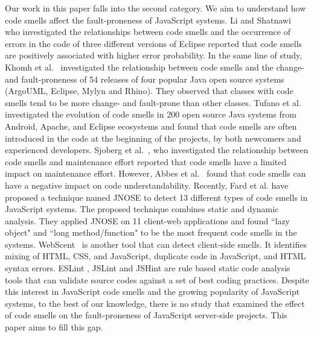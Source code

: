 \begin{sloppypar}
Our work in this paper falls into the second category. We aim to understand how code smells affect the fault-proneness of JavaScript systems. Li and Shatnawi~\cite{shatnawi2006investigation} who investigated the relationships between code smells and the occurrence of errors in the code of three different versions of Eclipse reported that code smells are positively associated with higher error probability. In the same line of study, Khomh et al.~\cite{khomh2012exploratory} investigated the relationship between code smells and the change- and fault-proneness of 54 releases of four popular Java open source systems (ArgoUML, Eclipse, Mylyn and Rhino). They observed that classes with code smells tend to be more change- and fault-prone than other classes. Tufano et al. \cite{tufano2015and} investigated the evolution of code smells in 200 open source Java systems from Android, Apache, and Eclipse ecosystems and found that code smells are often introduced in the code at the beginning of the projects, by both newcomers and experienced developers. Sjoberg et al.~\cite{Sjoberg13QEC}, who investigated the relationship between code smells and maintenance effort reported that code smells have a limited impact on maintenance effort. However, Abbes et al.~\cite{Abbes11} found that code smells can have a negative impact on code understandability. Recently, Fard et al. \cite{fard2013jsnose} have proposed a technique named JNOSE to detect 13 different types of code smells in JavaScript systems. The proposed technique combines static and dynamic analysis. They applied JNOSE on 11 client-web applications and found ``lazy object" and ``long method/function" to be the most frequent code smells in the systems. WebScent~\cite{nguyen2012detection} is another tool that can detect client-side smells. It identifies mixing of HTML, CSS, and JavaScript, duplicate code in JavaScript, and HTML syntax errors. ESLint \cite{ESLint}, JSLint \cite{JslinT} and JSHint \cite{JSHint} are rule based static code analysis tools that can validate source codes against a set of best coding practices. Despite this interest in JavaScript code smells and the growing popularity of JavaScript systems, to the best of our knowledge, there is no study that examined the effect of code smells on the fault-proneness of JavaScript server-side projects. This paper aims to fill this gap. 
\end{sloppypar}

